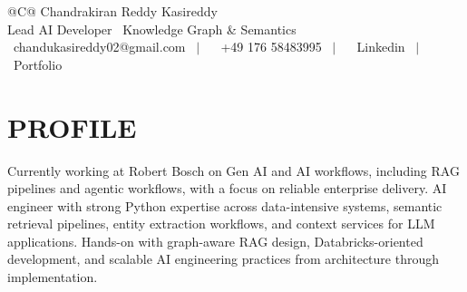 \documentclass[a4paper,11pt]{article}
\newcommand{\safehref}[2]{#2}
\let\href\safehref
\begin{document}
\pagestyle{empty}

\begin{tabularx}{\linewidth}{@{}C@{}}
  \Huge{Chandrakiran Reddy Kasireddy}\\[10pt]
  
  \large{Lead AI Developer \textbar\ Knowledge Graph \& Semantics}\\[3pt]


  \href{mailto: chandukasireddy02@gmail.com}{\raisebox{-0.05\height}{\faEnvelope} \ chandukasireddy02@gmail.com} \ $|$ \
  \href{tel:+49 176 58483995}{ \ +49 176 58483995} \ $|$ \
  \href{https://www.linkedin.com/in/chandukasireddy/}{\raisebox{-0.05\height}{\faLinkedin} \ Linkedin} \ $|$ \
  \href{https://chandu.graspins.com/}{\raisebox{-0.05\height}{\faLink} \ Portfolio}\\
\end{tabularx}

\section*{PROFILE}
Currently working at Robert Bosch on Gen AI and AI workflows, including RAG pipelines and agentic workflows, with a focus on reliable enterprise delivery. AI engineer with strong Python expertise across data-intensive systems, semantic retrieval pipelines, entity extraction workflows, and context services for LLM applications. Hands-on with graph-aware RAG design, Databricks-oriented development, and scalable AI engineering practices from architecture through implementation.


\end{document}
